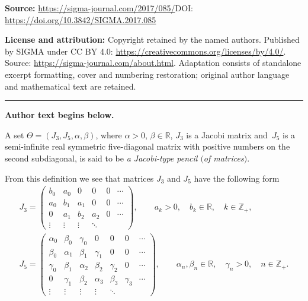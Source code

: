 \documentclass[11pt]{article}
\numberwithin{equation}{section}
\begin{document}
\noindent\textbf{Source:} \url{https://sigma-journal.com/2017/085/}\quad DOI: \url{https://doi.org/10.3842/SIGMA.2017.085}\par
\noindent\textbf{License and attribution:} Copyright retained by the named authors. Published by SIGMA under CC BY 4.0: \url{https://creativecommons.org/licenses/by/4.0/}. Source: \url{https://sigma-journal.com/about.html}. Adaptation consists of standalone excerpt formatting, cover and numbering restoration; original author language and mathematical text are retained.\par
\medskip\hrule\medskip\noindent\textbf{Author text begins below.}\par
\setcounter{section}{1}
\setcounter{subsection}{0}
\setcounter{subsubsection}{0}
\setcounter{Theorem}{1}
\setcounter{equation}{1}
\begin{Definition}\label{d1_1}A set $\Theta = (J_3, J_5, \alpha, \beta)$, where $\alpha>0$, $\beta\in\mathbb{R}$, $J_3$ is a Jacobi matrix and~$J_5$ is a semi-inf\/inite real symmetric f\/ive-diagonal matrix with positive numbers on the second subdiagonal, is said to be \textit{a Jacobi-type pencil $($of matrices$)$}.
\end{Definition}
From this def\/inition we see that matrices $J_3$ and $J_5$ have the following form
\begin{gather}
J_3 =
\left(
\begin{matrix}
b_0 & a_0 & 0 & 0 & 0 & \cdots\\
a_0 & b_1 & a_1 & 0 & 0 & \cdots\\
0 & a_1 & b_2 & a_2 & 0 &\cdots\\
\vdots & \vdots & \vdots & \ddots \end{matrix}
\right),\qquad a_k>0,\quad b_k\in\mathbb{R},\quad k\in\mathbb{Z}_+, \label{f1_5} \\
J_5 = \left(
\begin{matrix}
\alpha_0 & \beta_0 & \gamma_0 & 0 & 0 & 0 & \cdots\\
\beta_0 & \alpha_1 & \beta_1 & \gamma_1 & 0 & 0 & \cdots\\
\gamma_0 & \beta_1 & \alpha_2 & \beta_2 & \gamma_2 & 0 & \cdots\\
0 & \gamma_1 & \beta_2 & \alpha_3 & \beta_3 & \gamma_3 & \cdots \\
\vdots & \vdots & \vdots &\vdots & \ddots \end{matrix}
\right),\qquad \alpha_n,\beta_n\in\mathbb{R},\quad \gamma_n>0,\quad n\in\mathbb{Z}_+. \label{f1_10}
\end{gather}
\end{document}
